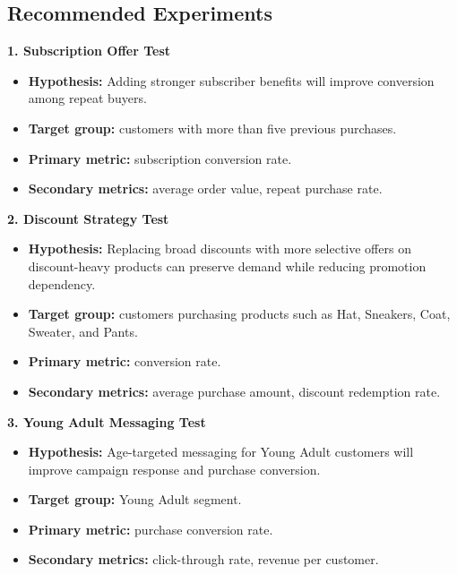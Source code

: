 \documentclass[12pt,a4paper]{article}
\begin{document}
\subsection{Recommended Experiments}
\textbf{1. Subscription Offer Test}
\begin{itemize}
  \item \textbf{Hypothesis:} Adding stronger subscriber benefits will improve conversion among repeat buyers.
  \item \textbf{Target group:} customers with more than five previous purchases.
  \item \textbf{Primary metric:} subscription conversion rate.
  \item \textbf{Secondary metrics:} average order value, repeat purchase rate.
\end{itemize}

\textbf{2. Discount Strategy Test}
\begin{itemize}
  \item \textbf{Hypothesis:} Replacing broad discounts with more selective offers on discount-heavy products can preserve demand while reducing promotion dependency.
  \item \textbf{Target group:} customers purchasing products such as Hat, Sneakers, Coat, Sweater, and Pants.
  \item \textbf{Primary metric:} conversion rate.
  \item \textbf{Secondary metrics:} average purchase amount, discount redemption rate.
\end{itemize}

\textbf{3. Young Adult Messaging Test}
\begin{itemize}
  \item \textbf{Hypothesis:} Age-targeted messaging for Young Adult customers will improve campaign response and purchase conversion.
  \item \textbf{Target group:} Young Adult segment.
  \item \textbf{Primary metric:} purchase conversion rate.
  \item \textbf{Secondary metrics:} click-through rate, revenue per customer.
\end{itemize}
\end{document}
